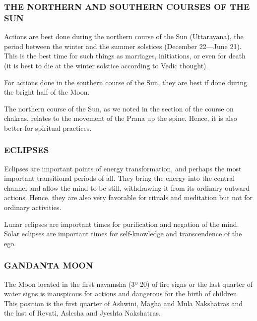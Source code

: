 \begin{enumerate}
\begin{enumerate}
 

\subsubsection{THE NORTHERN AND SOUTHERN COURSES OF THE SUN}

Actions are best done during the northern course of the Sun (Uttarayana), the period between the winter and the summer solstices (December 22—June 21). This is the best time for such things as marriages, initiations, or even for death (it is best to die at the winter solstice according to Vedic thought).

 

For actions done in the southern course of the Sun, they are best if done during the bright half of the Moon.

 

The northern course of the Sun, as we noted in the section of the course on chakras, relates to the movement of the Prana up the spine. Hence, it is also better for spiritual practices.

 

\subsubsection{ECLIPSES}

Eclipses are important points of energy transformation, and perhaps the most important transitional periods of all. They bring the energy into the central channel and allow the mind to be still, withdrawing it from its ordinary outward actions. Hence, they are also very favorable for rituals and meditation but not for ordinary activities.

 

Lunar eclipses are important times for purification and negation of the mind. Solar eclipses are important times for self-knowledge and transcendence of the ego.

 

\subsubsection{GANDANTA MOON}
The Moon located in the first navamsha (3º 20) of fire signs or the last quarter of water signs is inauspicous for actions and dangerous for the birth of children. This position is the first quarter of Ashwini, Magha and Mula Nakshatras and the last of Revati, Aslesha and Jyeshta Nakshatras.

 


\end{enumerate}
\end{enumerate}
